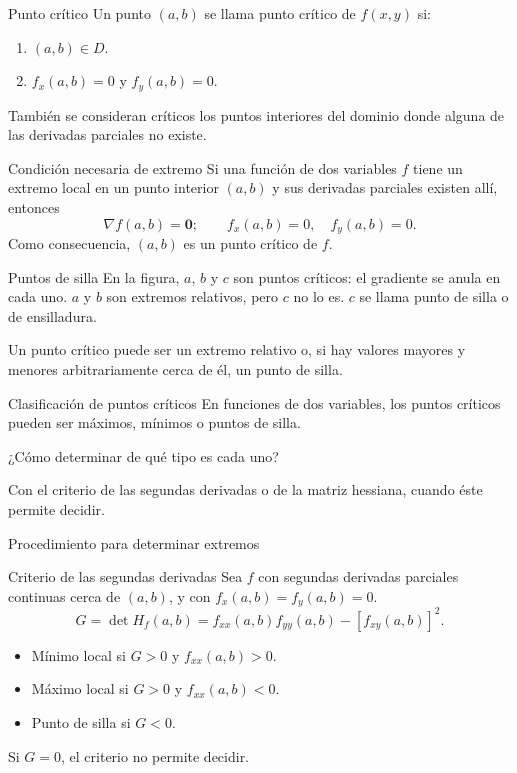 \documentclass[original_version/main.tex]{subfiles}
\begin{document}
\begin{frame}{Punto crítico}
Un punto $(a,b)$ se llama punto crítico de $f(x,y)$ si:
\begin{enumerate}
\item $(a,b)\in D$.
\item $f_x(a,b)=0$ y $f_y(a,b)=0$.
\end{enumerate}
También se consideran críticos los puntos interiores del dominio donde alguna de las derivadas parciales no existe.
\end{frame}
\begin{frame}{Condición necesaria de extremo}
Si una función de dos variables $f$ tiene un extremo local en un punto interior $(a,b)$ y sus derivadas parciales existen allí, entonces
\[\nabla f(a,b)=\mathbf0;\qquad f_x(a,b)=0,\quad f_y(a,b)=0.\]
Como consecuencia, $(a,b)$ es un punto crítico de $f$.
\end{frame}
\begin{frame}{Puntos de silla}
\small En la figura, $a$, $b$ y $c$ son puntos críticos: el gradiente se anula en cada uno. $a$ y $b$ son extremos relativos, pero $c$ no lo es. $c$ se llama punto de silla o de ensilladura.
\medskip

Un punto crítico puede ser un extremo relativo o, si hay valores mayores y menores arbitrariamente cerca de él, un punto de silla.
\end{frame}
\begin{frame}{Clasificación de puntos críticos}
En funciones de dos variables, los puntos críticos pueden ser máximos, mínimos o puntos de silla.
\medskip

¿Cómo determinar de qué tipo es cada uno?
\medskip

Con el criterio de las segundas derivadas o de la matriz hessiana, cuando éste permite decidir.
\end{frame}
\begin{frame}{Procedimiento para determinar extremos}
\end{frame}
\begin{frame}{Criterio de las segundas derivadas}
\small Sea $f$ con segundas derivadas parciales continuas cerca de $(a,b)$, y con $f_x(a,b)=f_y(a,b)=0$.
\[G=\det H_f(a,b)=f_{xx}(a,b)f_{yy}(a,b)-[f_{xy}(a,b)]^2.\]
\begin{itemize}
\item Mínimo local si $G>0$ y $f_{xx}(a,b)>0$.
\item Máximo local si $G>0$ y $f_{xx}(a,b)<0$.
\item Punto de silla si $G<0$.
\end{itemize}
Si $G=0$, el criterio no permite decidir.
\end{frame}
\end{document}

